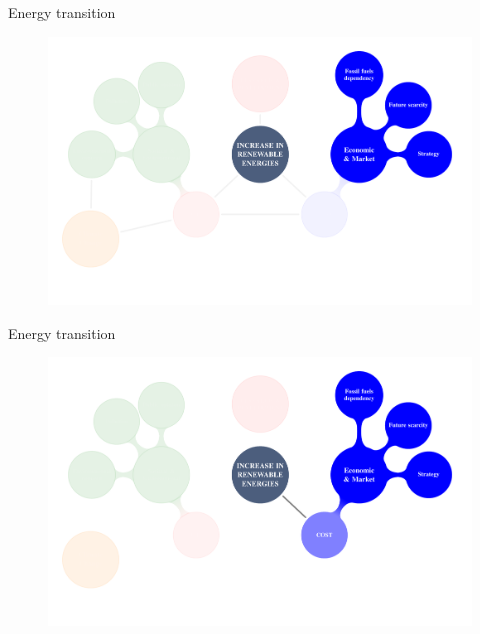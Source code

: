 \documentclass{beamer}%
\begin{document}
\begin{frame}[fragile]{Energy transition}
\begin{figure}
\centering\includegraphics[scale=0.4]{diagrama1.pdf}
\end{figure} 
\end{frame}

\begin{frame}[fragile]{Energy transition}
\begin{figure}
\centering\includegraphics[scale=0.4]{diagrama2.pdf}
\end{figure} 
\end{frame}
\end{document}
